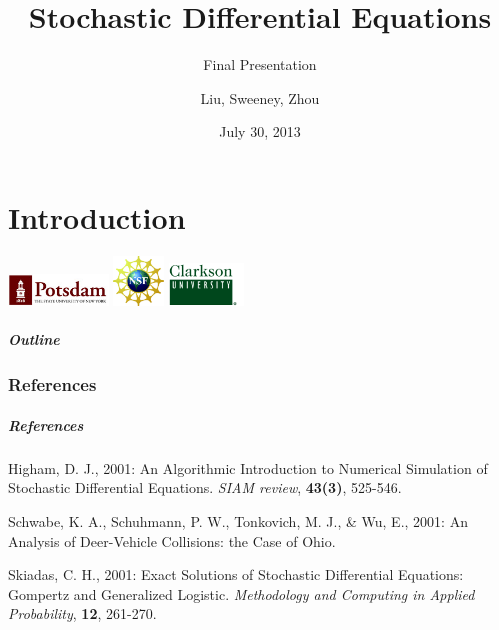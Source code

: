 \documentclass{beamer}   %
\begin{document}
\part{Introduction}


\title{Stochastic Differential Equations}
\subtitle{Final Presentation}

\author{Liu, Sweeney, Zhou}
\date{July 30, 2013}

\begin{frame}[plain]
  \titlepage
  \begin{center}
  \includegraphics[width=0.2\textwidth]{SUNYPotsdam}
  \includegraphics[width=0.1\textwidth]{nsf_logobig}
  \includegraphics[width=0.15\textwidth]{clarksonGreen}
\end{center}
\end{frame}

\begin{frame}
  \frametitle{Outline}
  \vspace{-5mm}
\end{frame}











\section{References}

\begin{frame}
    \frametitle{References}

\begin{thebibliography}{3}

Higham, D. J., 2001:
An Algorithmic Introduction to Numerical Simulation of Stochastic Differential Equations.
\emph{SIAM review},
\textbf{43(3)}, 525-546.

Schwabe, K. A., Schuhmann, P. W., Tonkovich, M. J., \& Wu, E., 2001:
An Analysis of Deer-Vehicle Collisions: the Case of Ohio.

Skiadas, C. H., 2001:
Exact Solutions of Stochastic Differential Equations: Gompertz and Generalized Logistic.
\emph{Methodology and Computing in Applied Probability},
\textbf{12}, 261-270.

\end{thebibliography}

\end{frame}
\end{document}
